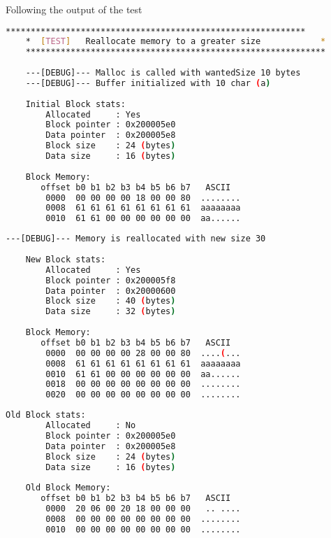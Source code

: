     Following the output of the test

    \begin{outputbox}
    \begin{lstlisting}[language=bash]
    ************************************************************
    *  [TEST]   Reallocate memory to a greater size            *
    ************************************************************
    
    ---[DEBUG]--- Malloc is called with wantedSize 10 bytes
    ---[DEBUG]--- Buffer initialized with 10 char (a)
    
    Initial Block stats:
        Allocated     : Yes
        Block pointer : 0x200005e0
        Data pointer  : 0x200005e8
        Block size    : 24 (bytes)
        Data size     : 16 (bytes)
    
    Block Memory:
       offset b0 b1 b2 b3 b4 b5 b6 b7   ASCII
        0000  00 00 00 00 18 00 00 80  ........
        0008  61 61 61 61 61 61 61 61  aaaaaaaa
        0010  61 61 00 00 00 00 00 00  aa......
    \end{lstlisting}
    \end{outputbox}
    
    \begin{outputbox}
    \begin{lstlisting}[language=bash]
    ---[DEBUG]--- Memory is reallocated with new size 30
    
    New Block stats:
        Allocated     : Yes
        Block pointer : 0x200005f8
        Data pointer  : 0x20000600
        Block size    : 40 (bytes)
        Data size     : 32 (bytes)
    
    Block Memory:
       offset b0 b1 b2 b3 b4 b5 b6 b7   ASCII
        0000  00 00 00 00 28 00 00 80  ....(...
        0008  61 61 61 61 61 61 61 61  aaaaaaaa
        0010  61 61 00 00 00 00 00 00  aa......
        0018  00 00 00 00 00 00 00 00  ........
        0020  00 00 00 00 00 00 00 00  ........
    \end{lstlisting}
    \end{outputbox}
    
    \begin{outputbox}
    \begin{lstlisting}[language=bash]
    Old Block stats:
        Allocated     : No
        Block pointer : 0x200005e0
        Data pointer  : 0x200005e8
        Block size    : 24 (bytes)
        Data size     : 16 (bytes)
    
    Old Block Memory:
       offset b0 b1 b2 b3 b4 b5 b6 b7   ASCII
        0000  20 06 00 20 18 00 00 00   .. ....
        0008  00 00 00 00 00 00 00 00  ........
        0010  00 00 00 00 00 00 00 00  ........
    \end{lstlisting}
    \end{outputbox}
    
